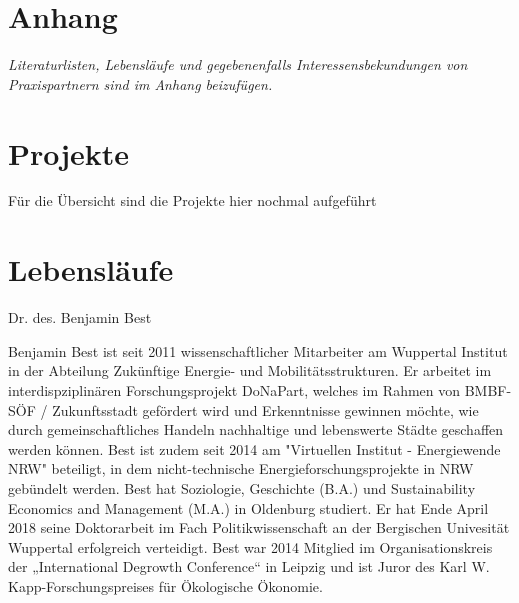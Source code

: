 \documentclass[a4paper,11pt,twoside]{scrartcl}
\begin{document}
\clearpage


%


\clearpage
\appendix

\section{Anhang}

\textit{Literaturlisten, Lebensläufe und gegebenenfalls Interessensbekundungen von Praxispartnern sind im Anhang beizufügen.}

\section{Projekte}
Für die Übersicht sind die Projekte hier nochmal aufgeführt


\section{Lebensläufe}

Dr. des. Benjamin Best 

Benjamin Best ist seit 2011 wissenschaftlicher Mitarbeiter am Wuppertal Institut in der Abteilung Zukünftige Energie- und Mobilitätsstrukturen. Er arbeitet im interdispziplinären Forschungsprojekt DoNaPart, welches im Rahmen von BMBF-SÖF / Zukunftsstadt gefördert wird und Erkenntnisse gewinnen möchte, wie durch gemeinschaftliches Handeln nachhaltige und lebenswerte Städte geschaffen werden können. Best ist zudem seit 2014 am "Virtuellen Institut - Energiewende NRW" beteiligt, in dem nicht-technische Energieforschungsprojekte in NRW gebündelt werden. 
Best hat Soziologie, Geschichte (B.A.) und Sustainability Economics and Management (M.A.) in Oldenburg studiert. Er hat Ende April 2018 seine Doktorarbeit im Fach Politikwissenschaft an der Bergischen Univesität Wuppertal erfolgreich verteidigt. Best war 2014 Mitglied im Organisationskreis der „International Degrowth Conference“ in Leipzig und ist Juror des Karl W. Kapp-Forschungspreises für Ökologische Ökonomie. 

\end{document}
